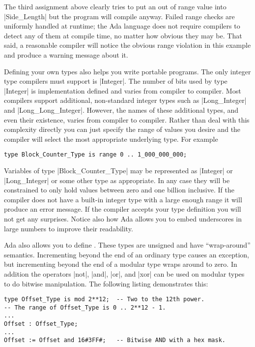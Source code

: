 The third assignment above clearly tries to put an out of range value into |Side_Length| but the
program will compile anyway. Failed range checks are uniformly handled at runtime; the Ada
language does not require compilers to detect any of them at compile time, no matter how obvious
they may be. That said, a reasonable compiler will notice the obvious range violation in this
example and produce a warning message about it.

Defining your own types also helps you write portable programs. The only integer type compilers
must support is |Integer|. The number of bits used by type |Integer| is implementation defined
and varies from compiler to compiler. Most compilers support additional, non-standard integer
types such as |Long_Integer| and |Long_Long_Integer|. However, the names of these additional
types, and even their existence, varies from compiler to compiler. Rather than deal with this
complexity directly you can just specify the range of values you desire and the compiler will
select the most appropriate underlying type. For example

\begin{lstlisting}
type Block_Counter_Type is range 0 .. 1_000_000_000;
\end{lstlisting}

Variables of type |Block_Counter_Type| may be represented as |Integer| or |Long_Integer| or some
other type as appropriate. In any case they will be constrained to only hold values between zero
and one billion inclusive. If the compiler does not have a built-in integer type with a large
enough range it will produce an error message. If the compiler accepts your type definition you
will not get any surprises. Notice also how Ada allows you to embed underscores in large numbers
to improve their readability.

Ada also allows you to define . These types are unsigned and have
``wrap-around'' semantics. Incrementing beyond the end of an ordinary type causes an exception,
but incrementing beyond the end of a modular type wraps around to zero. In addition the
operators |not|, |and|, |or|, and |xor| can be used on modular types to do bitwise manipulation.
The following listing demonstrates this:

\begin{lstlisting}
type Offset_Type is mod 2**12;  -- Two to the 12th power.
-- The range of Offset_Type is 0 .. 2**12 - 1.
...
Offset : Offset_Type;
...
Offset := Offset and 16#3FF#;   -- Bitwise AND with a hex mask.
\end{lstlisting}

